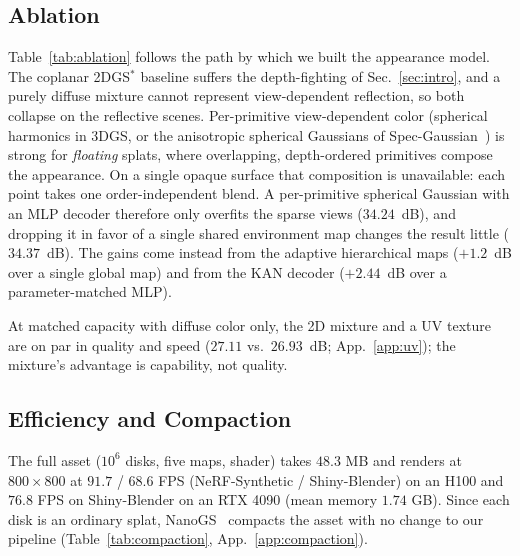\subsection{Ablation}
\label{sec:ablation}
Table~\ref{tab:ablation} follows the path by which we built the appearance model. The coplanar
2DGS$^{*}$ baseline suffers the depth-fighting of Sec.~\ref{sec:intro}, and a purely diffuse mixture
cannot represent view-dependent reflection, so both collapse on the reflective scenes. Per-primitive
view-dependent color (spherical harmonics in 3DGS, or the anisotropic spherical Gaussians of
Spec-Gaussian~\citep{specGaussian}) is strong for \emph{floating} splats, where overlapping,
depth-ordered primitives compose the appearance. On a single opaque surface that composition is
unavailable: each point takes one order-independent blend. A per-primitive spherical Gaussian with an
MLP decoder therefore only overfits the sparse views ($34.24$~dB), and dropping it in favor of a
single shared environment map changes the result little ($34.37$~dB). The gains come instead from the
adaptive hierarchical maps ($+1.2$~dB over a single global map) and from the KAN decoder
($+2.44$~dB over a parameter-matched MLP). 

\begin{addblock}
At matched capacity with diffuse color only, the 2D mixture and a UV texture are on par in quality
and speed ($27.11$ vs.\ $26.93$~dB; App.~\ref{app:uv}); the mixture's advantage is capability, not
quality.
\end{addblock}

\subsection{Efficiency and Compaction}
\label{sec:compaction}
The full asset ($10^6$ disks, five maps, shader) takes $48.3$ MB and renders at
$800{\times}800$ at $91.7$ / $68.6$ FPS (NeRF-Synthetic / Shiny-Blender) on an H100 and $76.8$ FPS on
Shiny-Blender on an RTX 4090 (mean memory $1.74$ GB). Since each disk is an ordinary splat,
NanoGS~\citep{nanogs} compacts the asset with no change to our pipeline (Table~\ref{tab:compaction}, App.~\ref{app:compaction}).

